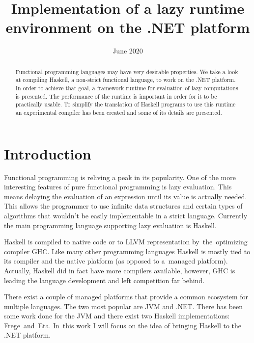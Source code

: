 \documentclass[en]{pracamgr}
\title{Implementation of a lazy runtime environment on the .NET platform}
\date{June 2020}
\begin{document}
\maketitle

\begin{abstract}
  Functional programming languages may have very desirable properties.
We take a look at compiling Haskell, a non-strict functional language,
to work on the .NET platform. In order to achieve that goal, a framework
runtime for evaluation of lazy computations is presented.
The performance of the runtime is important in order for it to be practically usable.
To simplify the translation
of Haskell programs to use this runtime an experimental compiler has been
created and some of its details are presented.
\end{abstract}

\tableofcontents

\chapter*{Introduction}

Functional programming is reliving a peak in its popularity.
One of the more interesting features of pure functional programming
is lazy evaluation. This means delaying the evaluation of an expression
until its value is actually needed. This allows the programmer to use
infinite data structures and certain types of algorithms that wouldn't
be easily implementable in a strict language.
Currently the main programming language
supporting lazy evaluation is Haskell.

Haskell is compiled to native code or to LLVM representation by~the~optimizing
compiler GHC. Like many other programming languages Haskell is mostly
tied to its compiler and the native platform (as opposed to a~managed platform).
Actually, Haskell did in fact have more compilers available, however,
GHC is leading the language development and left competition far behind.

There exist a couple of managed platforms that provide a common ecosystem
for multiple languages. The two most popular are JVM and .NET.
There has been some work done for the JVM \cite{Tullsen,Choi,Stewart}
and there exist two Haskell implementations: 
\href{https://github.com/Frege/frege}{Frege}~and~\href{https://eta-lang.org/}{Eta}.
In~this work I will focus on the idea of bringing
Haskell to the .NET platform.
\end{document}
